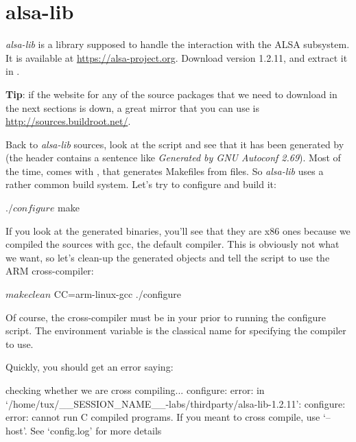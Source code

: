 \section{alsa-lib}

{\em alsa-lib} is a library supposed to handle the interaction with
the ALSA subsystem. It is available at \url{https://alsa-project.org}.
Download version 1.2.11, and extract it
in .

{\bf Tip}: if the website for any of the source packages that we
need to download in the next sections is down, a great mirror
that you can use is \url{http://sources.buildroot.net/}.

Back to {\em alsa-lib} sources, look at the  script
and see that it has been generated by  (the header
contains a sentence like {\em Generated by GNU Autoconf 2.69}). Most of
the time,  comes with , that generates
Makefiles from  files. So {\em alsa-lib} uses a rather
common build system. Let's try to configure and build it:

\begin{bashinput}
$ ./configure
$ make
\end{bashinput}

If you look at the generated binaries, you'll see that they are
x86 ones because we compiled the sources with gcc, the default compiler.
This is obviously not what we want, so let's clean-up the generated objects
and tell the  script to use the ARM cross-compiler:

\begin{bashinput}
$ make clean
$ CC=arm-linux-gcc ./configure
\end{bashinput}

Of course, the  cross-compiler must be in your
 prior to running the configure script. The  environment
variable is the classical name for specifying the compiler to
use.

Quickly, you should get an error saying:

\begin{terminaloutput}
checking whether we are cross compiling... configure: error: in `/home/tux/__SESSION_NAME__-labs/thirdparty/alsa-lib-1.2.11':
configure: error: cannot run C compiled programs.
If you meant to cross compile, use `--host'.
See `config.log' for more details
\end{terminaloutput}
\normalsize

